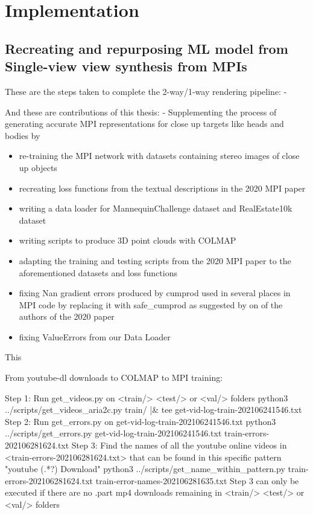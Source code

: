 \chapter{Implementation}\label{ch:implementation}

\section{Recreating and repurposing ML model from Single-view view synthesis from MPIs}\label{sec:contributions}






These are the steps taken to complete the 2-way/1-way rendering pipeline: -

And these are contributions of this thesis: -
Supplementing the process of generating accurate MPI representations for close up targets like heads and bodies by 
\begin{itemize}
    \item re-training the MPI network with datasets containing stereo images of close up objects  
    \item recreating loss functions from the textual descriptions in the 2020 MPI paper
    \item writing a data loader for MannequinChallenge dataset and RealEstate10k dataset
    \item writing scripts to produce 3D point clouds with COLMAP
    \item adapting the training and testing scripts from the 2020 MPI paper to the aforementioned datasets and loss functions
    \item fixing Nan gradient errors produced by cumprod used in several places in MPI code by replacing it with safe\_cumprod as suggested by on of the authors of the 2020 paper
    \item fixing ValueErrors from our Data Loader
\end{itemize}
This 



From youtube-dl downloads to COLMAP to MPI training:

Step 1: Run get_videos.py on <train/> <test/> or <val/> folders
python3 ../scripts/get_videos_aria2c.py train/ |& tee get-vid-log-train-202106241546.txt
Step 2: Run get_errors.py on get-vid-log-train-202106241546.txt
python3 ../scripts/get_errors.py get-vid-log-train-202106241546.txt train-errors-202106281624.txt
Step 3: Find the names of all the youtube online videos in <train-errors-202106281624.txt> that can be found in this specific pattern
"youtube\] (.*?)\: Download"
python3 ../scripts/get_name_within_pattern.py train-errors-202106281624.txt train-error-names-202106281635.txt
Step 3 can only be executed if there are no .part mp4 downloads remaining in <train/> <test/> or <val/> folders
 
